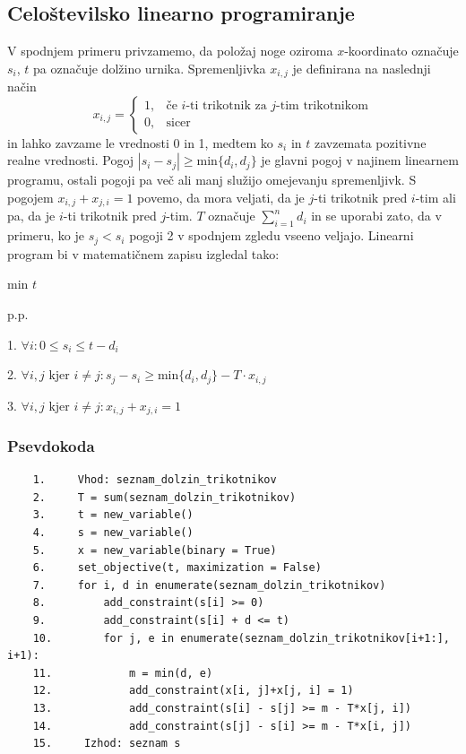 \documentclass[a4paper,12pt]{article}
\theoremstyle{definition}
\theoremstyle{plain}
\begin{document}
\subsection{Celoštevilsko linearno programiranje}
V spodnjem primeru privzamemo, da položaj noge oziroma $x$-koordinato označuje $s_i$, $t$ pa označuje dolžino urnika. Spremenljivka $x_{i,j}$ je definirana na naslednji način
$$
x_{i,j} =
\left\{
	\begin{array}{ll}
		1,  & \mbox{če } i\text{-ti trikotnik za } j\text{-tim trikotnikom} \\
		0,  & \mbox{sicer } 
	\end{array}
\right.
$$
in lahko zavzame le vrednosti 0 in 1, medtem ko $s_i$ in $t$ zavzemata pozitivne realne vrednosti. Pogoj $|s_i-s_j| \geq \text{min}\{d_i,d_j\}$ je glavni pogoj v najinem linearnem programu, ostali pogoji pa več ali manj služijo omejevanju spremenljivk.
\newpage
S pogojem $x_{i,j}+x_{j,i}=1$ povemo, da mora veljati, da je $j$-ti trikotnik pred $i$-tim ali pa, da je $i$-ti trikotnik pred $j$-tim.
$T$ označuje $\sum_{i=1}^n d_i$ in se uporabi zato, da v primeru, ko je $s_j < s_i$ pogoji 2 v spodnjem zgledu vseeno veljajo.
Linearni program bi v matematičnem zapisu izgledal tako:
\begin{center}
    min $t$

    p.p.

    1.  $\forall i: 0 \leq s_i \leq t-d_i$

    \medskip

    2.  $\forall i,j \text{ kjer } i\neq j: s_j - s_i \geq \text{min}\{d_i,d_j\}-T\cdot x_{i,j}$
    \medskip

    3.  $\forall i,j \text{ kjer } i\neq j: x_{i,j}+x_{j,i}=1$
\end{center}
\subsubsection{Psevdokoda}
\begin{verbatim}
    1.     Vhod: seznam_dolzin_trikotnikov
    2.     T = sum(seznam_dolzin_trikotnikov)
    3.     t = new_variable()
    4.     s = new_variable()
    5.     x = new_variable(binary = True)
    6.     set_objective(t, maximization = False)
    7.     for i, d in enumerate(seznam_dolzin_trikotnikov)
    8.         add_constraint(s[i] >= 0)
    9.         add_constraint(s[i] + d <= t)
    10.        for j, e in enumerate(seznam_dolzin_trikotnikov[i+1:], i+1):
    11.            m = min(d, e)
    12.            add_constraint(x[i, j]+x[j, i] = 1)
    13.            add_constraint(s[i] - s[j] >= m - T*x[j, i])
    14.            add_constraint(s[j] - s[i] >= m - T*x[i, j])
    15.     Izhod: seznam s
\end{verbatim}
\end{document}
